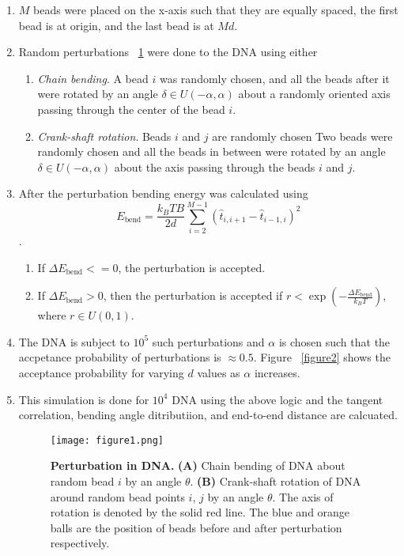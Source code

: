 \documentclass{scrartcl}
\begin{document}
\begin{enumerate}
\item $M$ beads were placed on the x-axis such that they are equally spaced, the first bead is at origin, and the last bead is at $Md$.
\item Random perturbations ~\ref{figure1} were done to the DNA using either
	\begin{enumerate}
	\item \textit{Chain bending}. A bead $i$ was randomly chosen, and all the beads after it were rotated by an angle $\delta \in U(-\alpha,\alpha)$ about a randomly oriented axis passing through the center of the bead $i$. 
	\item \textit{Crank-shaft rotation}. Beads $i$ and $j$ are randomly chosen Two beads were randomly chosen and all the beads in between were  rotated by an angle $\delta \in U(-\alpha,\alpha)$ about the axis passing through the beads $i$ and $j$.
	\end{enumerate}
\item After the perturbation bending energy was calculated using $$E_{\textrm{bend}} = \frac{k_B T B}{2 d} \sum_{i=2}^{M-1} \left( \hat{t}_{i,i+1} - \hat{t}_{i-1,i} \right)^2$$.
	\begin{enumerate}
	\item If $\Delta E_{\textrm{bend}} <= 0$, the perturbation is accepted.
	\item If $\Delta E_{\textrm{bend}} > 0$, then the perturbation is accepted if $r < \exp \left( -\frac{\Delta E_{\textrm{bend}}}{k_B T} \right)$, where $r \in U(0,1)$.
	\end{enumerate}
\item The DNA is subject to $10^5$ such perturbations and $\alpha$ is chosen such that the accpetance probability of perturbations is $\approx 0.5$. Figure ~\ref{figure2} shows the acceptance probability for varying $d$ values as $\alpha$ increases.
\item This simulation is done for $10^4$ DNA using the above logic and the tangent correlation, bending angle ditributiion, and end-to-end distance are calcuated.

\begin{figure}[t]
\label{figure1}
\centering
\texttt{[image: figure1.png]}
\caption{\textbf{Perturbation in DNA.} \textbf{(A)} Chain bending of DNA about random bead $i$ by an angle $\theta$. \textbf{(B)} Crank-shaft rotation of DNA around random bead points $i$, $j$ by an angle $\theta$. The axis of rotation is denoted by the solid red line. The blue and orange balls are the position of beads before and after perturbation respectively.}
\end{figure}


\end{enumerate}
\end{document}
